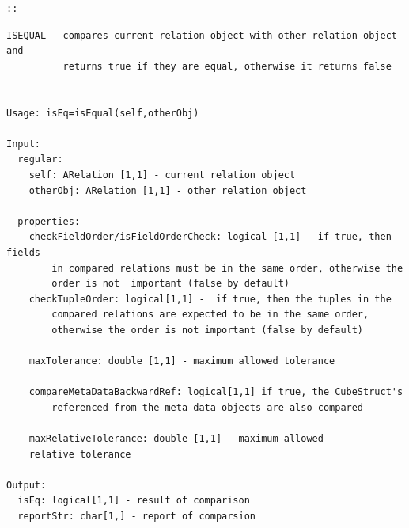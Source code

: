 \documentclass[letterpaper,10pt,english]{sphinxmanual}
\begin{document}
\begin{Verbatim}[commandchars=\\\{\}]
::
\end{Verbatim}

\begin{Verbatim}[commandchars=\\\{\}]
ISEQUAL - compares current relation object with other relation object and
          returns true if they are equal, otherwise it returns false


Usage: isEq=isEqual(self,otherObj)

Input:
  regular:
    self: ARelation [1,1] - current relation object
    otherObj: ARelation [1,1] - other relation object

  properties:
    checkFieldOrder/isFieldOrderCheck: logical [1,1] - if true, then fields
        in compared relations must be in the same order, otherwise the
        order is not  important (false by default)
    checkTupleOrder: logical[1,1] -  if true, then the tuples in the
        compared relations are expected to be in the same order,
        otherwise the order is not important (false by default)

    maxTolerance: double [1,1] - maximum allowed tolerance

    compareMetaDataBackwardRef: logical[1,1] if true, the CubeStruct's
        referenced from the meta data objects are also compared

    maxRelativeTolerance: double [1,1] - maximum allowed
    relative tolerance

Output:
  isEq: logical[1,1] - result of comparison
  reportStr: char[1,] - report of comparsion
\end{Verbatim}
\end{document}
